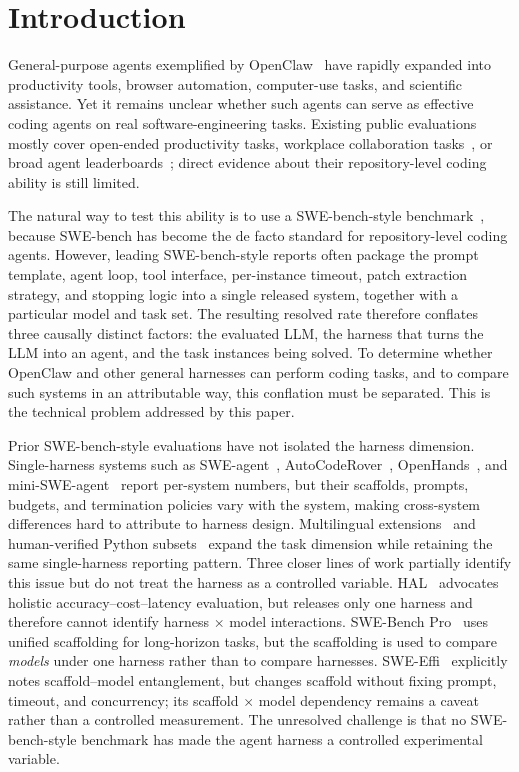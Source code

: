 \section{Introduction}

General-purpose agents exemplified by OpenClaw~\cite{steinberger_openclaw} have rapidly expanded into productivity tools, browser automation, computer-use tasks, and scientific assistance. Yet it remains unclear whether such agents can serve as effective coding agents on real software-engineering tasks. Existing public evaluations mostly cover open-ended productivity tasks, workplace collaboration tasks~\cite{ding_wildclawbench_2026, zai_zclawbench, meng2026clawmarklivingworldbenchmarkmultiturn}, or broad agent leaderboards~\cite{pinchbench, ye2026clawevaltrustworthyevaluationautonomous, clawbench_general, clawprobench2026}; direct evidence about their repository-level coding ability is still limited.

The natural way to test this ability is to use a SWE-bench-style benchmark~\cite{jimenez_swebench_2024}, because SWE-bench has become the de facto standard for repository-level coding agents. However, leading SWE-bench-style reports often package the prompt template, agent loop, tool interface, per-instance timeout, patch extraction strategy, and stopping logic into a single released system, together with a particular model and task set. The resulting resolved rate therefore conflates three causally distinct factors: the evaluated LLM, the harness that turns the LLM into an agent, and the task instances being solved. To determine whether OpenClaw and other general harnesses can perform coding tasks, and to compare such systems in an attributable way, this conflation must be separated. This is the technical problem addressed by this paper.

Prior SWE-bench-style evaluations have not isolated the harness dimension. Single-harness systems such as SWE-agent~\cite{swe_agent}, AutoCodeRover~\cite{zhang_autocoderover}, OpenHands~\cite{wang_openhands}, and mini-SWE-agent~\cite{mini_swe_agent} report per-system numbers, but their scaffolds, prompts, budgets, and termination policies vary with the system, making cross-system differences hard to attribute to harness design. Multilingual extensions~\cite{swe_smith} and human-verified Python subsets~\cite{swebench_verified_mini} expand the task dimension while retaining the same single-harness reporting pattern. Three closer lines of work partially identify this issue but do not treat the harness as a controlled variable. HAL~\cite{kapoor_hal} advocates holistic accuracy--cost--latency evaluation, but releases only one harness and therefore cannot identify harness $\times$ model interactions. SWE-Bench Pro~\cite{deng_swebench_pro} uses unified scaffolding for long-horizon tasks, but the scaffolding is used to compare \emph{models} under one harness rather than to compare harnesses. SWE-Effi~\cite{fan_swe_effi} explicitly notes scaffold--model entanglement, but changes scaffold without fixing prompt, timeout, and concurrency; its scaffold $\times$ model dependency remains a caveat rather than a controlled measurement. The unresolved challenge is that no SWE-bench-style benchmark has made the agent harness a controlled experimental variable.

